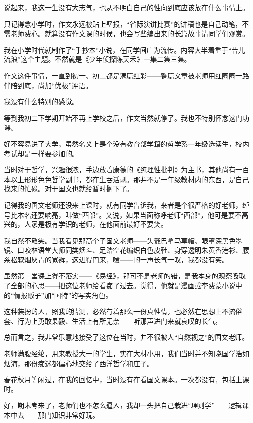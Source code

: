 \par 说起来，我这一生没有大志气，也从不明白自己的性向到底应该放在什么事情上。
\par 只记得念小学时，作文永远被贴上壁报，“省际演讲比赛”的讲稿也是自己动笔，不需老师费心。就算没有作文课的时候，也会写些编出来的长篇故事请同学们观赏。
\par 我在小学时代就制作了“手抄本”小说，在同学间广为流传。内容大半着重于“苦儿流浪”这个主题。不然就是《少年侦探陈天禾》一集二集三集。
\par 作文这件事情，一直到初一、初二都是满篇红彩——整篇文章被老师用红圈圈一路伴陪到底，尚加“优极”评语。
\par 我没有什么特别的感觉。
\par 等到我初二下学期开始不再上学校之后，作文当然就停了。我也不特别怀念这门功课。
\par 好不容易进了大学，虽然名义上是个没有教育部学籍的哲学系一年级选读生，校内考试却是一样要参加的。
\par 当时对于哲学，兴趣很浓，手边放着康德的《纯理性批判》为主书，其他尚有一百本以上形形色色哲学副书，都在生吞活剥。那并不是一年级教材内的东西，是自己找来的忙碌。对于国文也就给暂时搁下了。
\par 记得我的国文老师还没来上课时，就有同学告诉我，来者是个很严格的好老师，绰号比本名还要响亮，叫做“西部”。又说，如果当面称呼老师“西部”，他可是要不高兴的，人家是极有学识的老师，在他面前最好不要笑。
\par 我自然不敢笑。当我看见那高个子国文老师——头戴巴拿马草帽、眼罩深黑色墨镜、口咬林语堂大师同类烟斗、足踏空花编织白色皮鞋、身穿透明朱黄香港衫、腰系松软烟灰青的宽裤，这进得门来，嗳——的一声长气一叹，我都没有笑。
\par 虽然第一堂课上得不落实——《易经》，那可不是老师的错，是我本身的观察吸取了全部的心思——把这位老师给看痴了过去。觉得，他就是漫画或李费蒙小说中的“情报贩子”加“国特”的写实角色。
\par 这种装扮的人，照我的猜测，必然有着那么一份真性情，也必然在思想上不流俗套、行为上勇敢果毅、生活上有所无奈——听那声进门来就哀叹的长气。
\par 总而言之，我非常乐意地接受了这位在当时，并不很被人“自然视之”的国文老师。
\par 老师满腹经纶，用来教授大一的学生，实在大材小用，我们当时并不知晓国学浩如烟海，那份痴迷都偏心地交给了西洋哲学和庄子。
\par 春花秋月等闲过，在我的回忆中，当时没有在看国文课本。一次都没有，包括上课时。
\par 好，期末考来了，老师们也不怎么逼人，我却一头把自己栽进“理则学”——逻辑课本中去——那门知识非常好玩。
